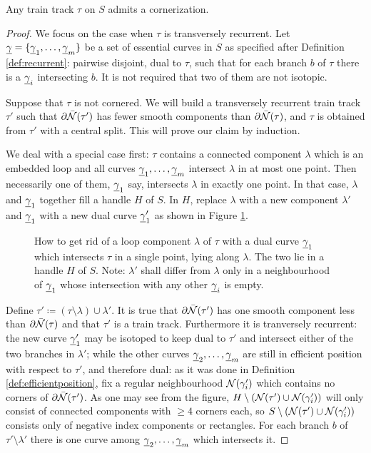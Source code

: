 \begin{lemma}\label{lem:cornerization}
Any train track $\tau$ on $S$ admits a cornerization.
\end{lemma}
\begin{proof}
We focus on the case when $\tau$ is transversely recurrent. Let $\underline{\gamma}=\{\underline{\gamma}_1,\ldots,\underline{\gamma}_m\}$ be a set of essential curves in $S$ as specified after Definition \ref{def:recurrent}: pairwise disjoint, dual to $\tau$, such that for each branch $b$ of $\tau$ there is a $\underline{\gamma}_i$ intersecting $b$. It is not required that two of them are not isotopic.

Suppose that $\tau$ is not cornered. We will build a transversely recurrent train track $\tau'$ such that $\partial\bar{{\mathcal N}}(\tau')$ has fewer smooth components than $\partial\bar{{\mathcal N}}(\tau)$, and $\tau$ is obtained from $\tau'$ with a central split. This will prove our claim by induction.

We deal with a special case first: $\tau$ contains a connected component $\lambda$ which is an embedded loop and all curves $\underline{\gamma}_1,\ldots,\underline{\gamma}_m$ intersect $\lambda$ in at most one point. Then necessarily one of them, $\underline{\gamma}_1$ say, intersects $\lambda$ in exactly one point. In that case, $\lambda$ and $\underline{\gamma}_1$ together fill a handle $H$ of $S$. In $H$, replace $\lambda$ with a new component $\lambda'$ and $\underline{\gamma}_1$ with a new dual curve $\underline{\gamma}'_1$ as shown in Figure \ref{fig:cornerizehandle}.

\begin{figure}[h]
\centering {}

\caption{\label{fig:cornerizehandle}How to get rid of a loop component $\lambda$ of $\tau$ with a dual curve $\underline{\gamma}_1$ which intersects $\tau$ in a single point, lying along $\lambda$. The two lie in a handle $H$ of $S$. Note: $\lambda'$ shall differ from $\lambda$ only in a neighbourhood of $\underline{\gamma}_1$ whose intersection with any other $\underline{\gamma}_i$ is empty.}
\end{figure}

Define $\tau'\coloneqq(\tau\setminus\lambda)\cup\lambda'$. It is true that $\partial\bar{{\mathcal N}}(\tau')$ has one smooth component less than $\partial\bar{{\mathcal N}}(\tau)$ and that $\tau'$ is a train track. Furthermore it is tranversely recurrent: the new curve $\underline{\gamma}'_1$ may be isotoped to keep dual to $\tau'$ and intersect either of the two branches in $\lambda'$; while the other curves $\underline{\gamma}_2,\ldots,\underline{\gamma}_m$ are still in efficient position with respect to $\tau'$, and therefore dual: as it was done in Definition \ref{def:efficientposition}, fix a regular neighbourhood ${\mathcal N}(\gamma_i')$ which contains no corners of $\partial\bar{{\mathcal N}}(\tau')$. As one may see from the figure, $H\setminus\left({\mathcal N}(\tau')\cup {\mathcal N}(\gamma_i')\right)$ will only consist of connected components with $\geq 4$ corners each, so $S\setminus\left({\mathcal N}(\tau')\cup {\mathcal N}(\gamma_i')\right)$ consists only of negative index components or rectangles. For each branch $b$ of $\tau'\setminus\lambda'$ there is one curve among $\underline{\gamma}_2,\ldots,\underline{\gamma}_m$ which intersects it.


\end{proof}
